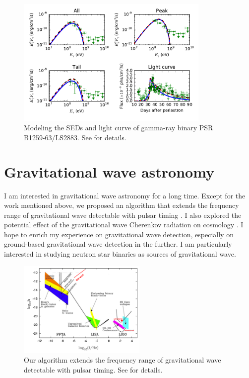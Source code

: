 \documentclass{article}
\begin{document}
\begin{figure}[b!]
\centering
\includegraphics[width =0.83\textwidth, trim=0 0 0cm 0cm]{FourForOne.pdf}
\caption{Modeling the SEDs and light curve of gamma-ray binary PSR B1259-63/LS2883. See \cite{2017ApJ...844..114Y} for details.}
\end{figure}
\newpage
\section{Gravitational wave astronomy}
I am interested in gravitational wave astronomy for a long time. Except for the work mentioned above, we proposed an algorithm that extends the frequency range of gravitational wave detectable with pulsar timing \citep{2016SCPMA..59h..95Y}. I also explored the potential effect of the gravitational wave Cherenkov radiation on cosmology \citep{2017MPLA...3250059Y}. I hope to enrich my experience on gravitational wave detection, especially on ground-based gravitational wave detection in the further. I am particularly interested in studying neutron star binaries as sources of gravitational wave. 
\begin{figure}[h!]
\centering
\includegraphics[width =0.55\textwidth, trim=0 0 0cm 0cm]{SN.png}
\caption{Our algorithm extends the frequency range of gravitational wave detectable with pulsar timing. See \cite{2016SCPMA..59h..95Y} for details.}
\label{fig:SN}
\end{figure}
\end{document}
